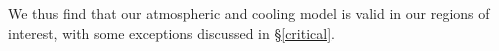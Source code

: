 %
%
%
%

We thus find that our atmospheric and cooling model is valid in our regions of interest, with some exceptions discussed in \S\ref{critical}. %




